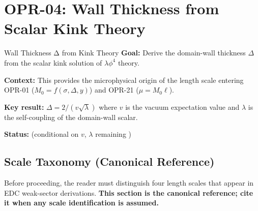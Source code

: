 
\chapter{OPR-04: Wall Thickness from Scalar Kink Theory}
\label{sec:ch16_opr04}

\begin{edcAtAGlance}{Wall Thickness Δ from Kink Theory}
\textbf{Goal:} Derive the domain-wall thickness $\Delta$ from the scalar kink
solution of $\lambda\phi^4$ theory.

\textbf{Context:} This provides the microphysical origin of the length scale
entering OPR-01 ($M_0 = f(\sigma, \Delta, y)$) and OPR-21 ($\mu = M_0 \ell$).

\textbf{Key result:} $\Delta = 2/(v\sqrt{\lambda})$ where $v$ is the vacuum
expectation value and $\lambda$ is the self-coupling of the domain-wall scalar.

\textbf{Status:} \tagDc{} (conditional on $v$, $\lambda$ remaining \tagP{})
\end{edcAtAGlance}

\section{Scale Taxonomy (Canonical Reference)}
\label{sec:ch16_reader_map}

Before proceeding, the reader must distinguish four length scales that
appear in EDC weak-sector derivations. \textbf{This section is the canonical
reference; cite it when any scale identification is assumed.}

